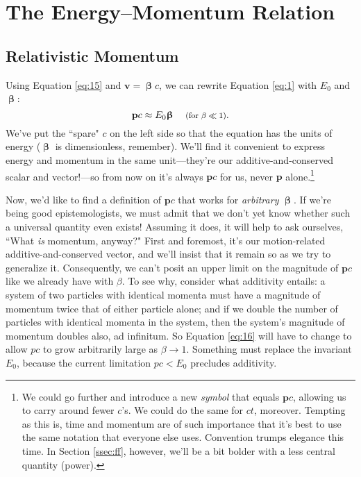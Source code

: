 \documentclass[12pt]{article}
\renewcommand{\vv}[1]{\mathbf{#1}}
\newcommand{\vvbeta}{\bm{\upbeta}}
\begin{document}
\section{The Energy--Momentum Relation}
\subsection{Relativistic Momentum}\label{ssec:rm}

Using Equation \ref{eq:15} and $\vv v = \vvbeta c$, we can rewrite Equation \ref{eq:1} with $E_0$ and $\vvbeta$:
\begin{equation}\label{eq:16}
\vv p c \approx E_0 \vvbeta \quad \textrm{\footnotesize{ (for $\beta \ll 1$)}}.
\end{equation}
We've put the ``spare" $c$ on the left side so that the equation has the units of energy ($\vvbeta$ is dimensionless, remember). We'll find it convenient to express energy and momentum in the same unit---they're our additive-and-conserved scalar and vector!---so from now on it's always $\vv p c$ for us, never $\vv p$ alone.\footnote{We could go further and introduce a new \emph{symbol} that equals $\vv p c$, allowing us to carry around fewer $c$'s. We could do the same for $ct$, moreover. Tempting as this is, time and momentum are of such importance that it's best to use the same notation that everyone else uses. Convention trumps elegance this time. In Section \ref{ssec:ff}, however, we'll be a bit bolder with a less central quantity (power).}

Now, we'd like to find a definition of $\vv p c$ that works for \emph{arbitrary} $\vvbeta$. If we're being good epistemologists, we must admit that we don't yet know whether such a universal quantity even exists! Assuming it does, it will help to ask ourselves, ``What \emph{is} momentum, anyway?" First and foremost, it's our motion-related additive-and-conserved vector, and we'll insist that it remain so as we try to generalize it. Consequently, we can't posit an upper limit on the magnitude of $\vv p c$ like we already have with $\beta$. To see why, consider what additivity entails: a system of two particles with identical momenta must have a magnitude of momentum twice that of either particle alone; and if we double the number of particles with identical momenta in the system, then the system's magnitude of momentum doubles also, ad infinitum. So Equation \ref{eq:16} will have to change to allow $p c$ to grow arbitrarily large as $\beta \rightarrow 1$. Something must replace the invariant $E_0$, because the current limitation $pc < E_0$ precludes additivity.
\end{document}

